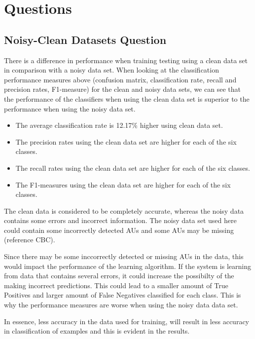 \documentclass[a4paper,11pt]{article}
\begin{document}
\section{Questions}

\subsection{Noisy-Clean Datasets Question}

There is a difference in performance when training testing using a clean data set in comparison with a noisy data set. When looking at the classification performance measures above (confusion matrix, classification rate, recall and precision rates, F1-measure) for the clean and noisy data sets, we can see that the performance of the classifiers when using the clean data set is superior to the performance when using the noisy data set.

\begin{itemize}
	\item The average classification rate is 12.17\% higher using clean data set. 
	\item The precision rates using the clean data set are higher for each of the six classes.
	\item The recall rates using the clean data set are higher for each of the six classes.
	\item The F1-measures using the clean data set are higher for each of the six classes.
\end{itemize}

The clean data is considered to be completely accurate, whereas the noisy data contains some errors and incorrect information. The noisy data set used here could contain some incorrectly detected AUs and some AUs may be missing (reference CBC). 

Since there may be some inccorrectly detected or missing AUs in the data, this would impact the performance of the learning algorithm. If the system is learning from data that contains several errors, it could increase the possibilty of the making incorrect predictions. This could lead to a smaller amount of True Positives and  larger amount of False Negatives classified for each class. This is why the performance measures are worse when using the noisy data data set. 

In essence, less accuracy in the data used for training, will result in less accuracy in classification of examples and this is evident in the results. 
\end{document}
